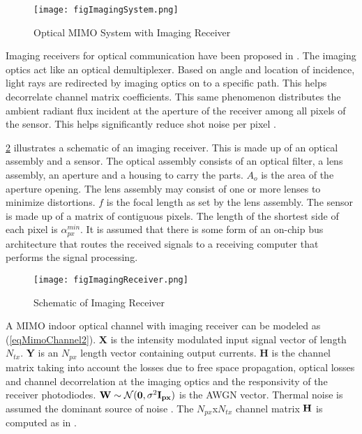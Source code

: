 \begin{figure}
	\centering
		\texttt{[image: figImagingSystem.png]}
	\caption{Optical MIMO System with Imaging Receiver}
	\label{fig:ImagingSystem}
\end{figure}

Imaging receivers for optical communication have been proposed in \cite{kah98a}. The imaging optics act like an optical demultiplexer. Based on angle and location of incidence, light rays are redirected by imaging optics on to a specific path. This helps decorrelate channel matrix coefficients. This same phenomenon distributes the ambient radiant flux incident at the aperture of the receiver among all pixels of the sensor. This helps significantly reduce shot noise per pixel \cite{dja00a}.

\figurename{\ref{fig:ImagingReceiver}} illustrates a schematic of an imaging receiver. This is made up of an optical assembly and a sensor. The optical assembly consists of an optical filter, a lens assembly, an aperture and a housing to carry the parts. $A_{o}$ is the area of the aperture opening. The lens assembly may consist of one or more lenses to minimize distortions. $f$ is the focal length as set by the lens assembly. The sensor is made up of a matrix of contiguous pixels. The length of the shortest side of each pixel is $\alpha_{px}^{min}$. It is assumed that there is some form of an on-chip bus architecture that routes the received signals to a receiving computer that performs the signal processing.

\begin{figure}
	\centering
		\texttt{[image: figImagingReceiver.png]}
	\caption{Schematic of Imaging Receiver}
	\label{fig:ImagingReceiver}
\end{figure}

A MIMO indoor optical channel with imaging receiver can be modeled as (\ref{eqMimoChannel2}). {\bf{X}} is the intensity modulated input signal vector of length $N_{tx}$. {\bf{Y}} is an $N_{px}$ length vector containing output currents. {\bf{H}} is the channel matrix taking into account the losses due to free space propagation, optical losses and channel decorrelation at the imaging optics and the responsivity of the receiver photodiodes. ${\bf{W}}\sim\mathcal{N}({\bf{0}},\sigma^2{\bf{I_{px}}})$ is the AWGN vector. Thermal noise is assumed the dominant source of noise \cite{dja00a}. The $N_{px}$x$N_{tx}$ channel matrix ${\bf{H}}$ is computed as in \cite{but13a}.


